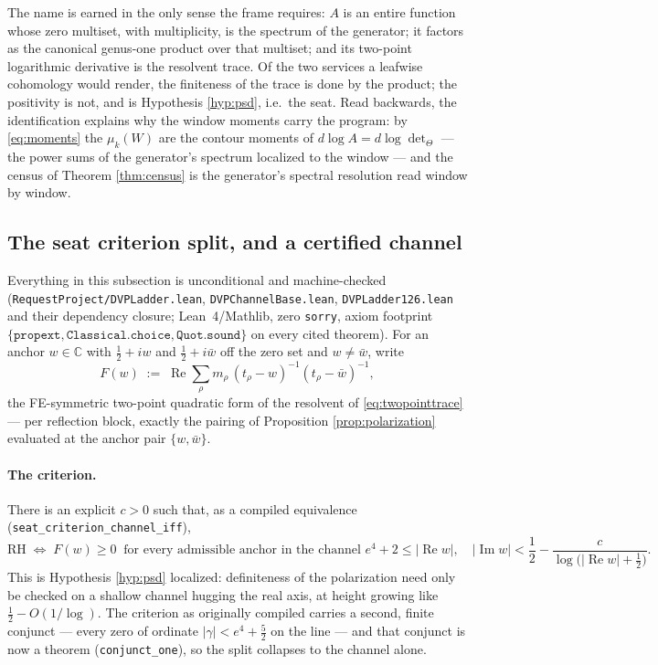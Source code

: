 \documentclass[11pt]{article}
\theoremstyle{plain}
\theoremstyle{definition}
\theoremstyle{remark}
\newcommand{\C}{\mathbb{C}}
\begin{document}
The name is earned in the only sense the frame requires: $A$ is an entire
function whose zero multiset, with multiplicity, is the spectrum of the
generator; it factors as the canonical genus-one product over that multiset;
and its two-point logarithmic derivative is the resolvent trace. Of the two
services a leafwise cohomology would render, the finiteness of the trace is
done by the product; the positivity is not, and is Hypothesis \ref{hyp:psd},
i.e.\ the seat. Read backwards, the identification explains why the window
moments carry the program: by \eqref{eq:moments} the $\mu_k(W)$ are the
contour moments of $d\log A=d\log\det\nolimits_\Theta$ --- the power sums of
the generator's spectrum localized to the window --- and the census of
Theorem \ref{thm:census} is the generator's spectral resolution read window
by window.

\subsection{The seat criterion split, and a certified channel}
\label{subsec:seatsplit}

Everything in this subsection is unconditional and machine-checked
(\texttt{RequestProject/DVPLadder.lean},
\texttt{DVPChannelBase.lean}, \texttt{DVPLadder126.lean} and their
dependency closure; Lean~4/Mathlib, zero \texttt{sorry}, axiom footprint
$\{\texttt{propext},\texttt{Classical.choice},\texttt{Quot.sound}\}$ on
every cited theorem). For an anchor $w\in\C$ with $\tfrac12+iw$ and
$\tfrac12+i\bar w$ off the zero set and $w\ne\bar w$, write
\[
  F(w)\;:=\;\operatorname{Re}\sum_{\rho} m_\rho\,
    (t_\rho-w)^{-1}(t_\rho-\bar w)^{-1},
\]
the FE-symmetric two-point quadratic form of the resolvent of
\eqref{eq:twopointtrace} --- per reflection block, exactly the pairing of
Proposition \ref{prop:polarization} evaluated at the anchor pair
$\{w,\bar w\}$.

\paragraph{The criterion.}
There is an explicit $c>0$ such that, as a compiled equivalence
(\texttt{seat\_criterion\_channel\_iff}),
\[
  \text{RH}
  \;\iff\;
  F(w)\ge 0\ \text{ for every admissible anchor in the channel }
  e^4+2\le|\operatorname{Re}w|,\quad
  |\operatorname{Im}w|<\frac12-\frac{c}{\log\bigl(|\operatorname{Re}w|
    +\tfrac12\bigr)}.
\]
This is Hypothesis \ref{hyp:psd} localized: definiteness of the
polarization need only be checked on a shallow channel hugging the real
axis, at height growing like $\tfrac12-O(1/\log)$. The criterion as
originally compiled carries a second, finite conjunct --- every zero of
ordinate $|\gamma|<e^4+\tfrac52$ on the line --- and that conjunct is now a
theorem (\texttt{conjunct\_one}), so the split collapses to the channel
alone.
\end{document}
